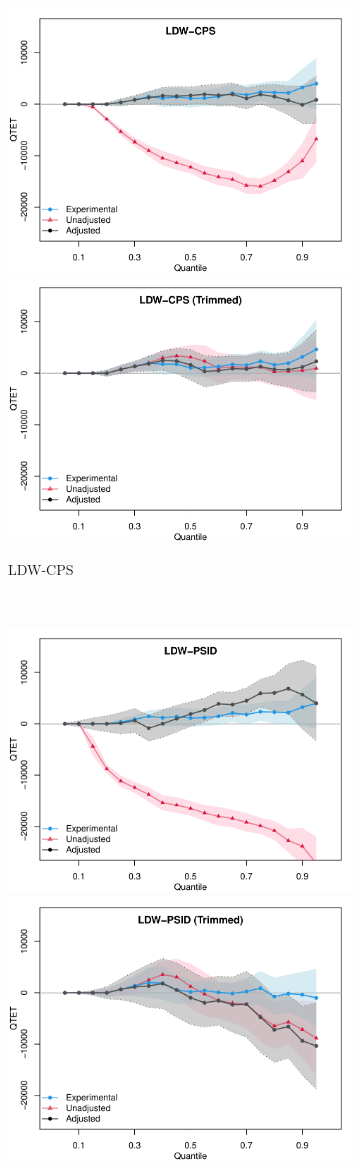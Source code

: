 \documentclass[letterpaper,12pt,leqno]{article}
\begin{document}
\begin{figure}[!ht]
    \caption{Quantile Treatment Effects: Experimental vs. Nonexperimental}\label{fig:ldw.qte}
    \begin{minipage}[c]{1\textwidth}
        \centering\vspace{-1em}
        \begin{subfigure}{1\linewidth}\hspace{1em}\centering
            \includegraphics[width=0.45\linewidth]{qte_ldw_cps.pdf}\hspace{2em}
            \includegraphics[width=0.45\linewidth]{qte_ldw_cps_trim.pdf}
            \caption{LDW-CPS}
        \end{subfigure}\\
        \begin{subfigure}{1\linewidth}\hspace{1em}\centering
            \includegraphics[width=0.45\linewidth]{qte_ldw_psid.pdf}\hspace{2em}
            \includegraphics[width=0.45\linewidth]{qte_ldw_psid_trim.pdf}

\end{subfigure}
\end{minipage}
\end{figure}
\end{document}
